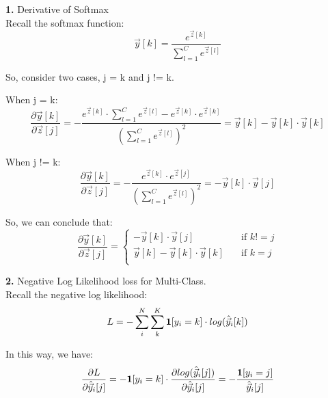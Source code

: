 \begin{description}
\item{\bf \large 1. } Derivative of Softmax \\
Recall the softmax function:
\begin{equation}
	\vec{y}[k] = \frac{e^{\vec{z}[k]}}{\sum_{l=1}^C e^{\vec{z}[l]}}
\end{equation}

So, consider two cases, j = k and j != k. 

When j = k:
\begin{equation}
	\frac{\partial \vec{y}[k]}{\partial \vec{z}[j]} 
		= - \frac{e^{\vec{z}[k]} \cdot \sum_{l=1}^C e^{\vec{z}[l]} - e^{\vec{z}[k]} \cdot e^{\vec{z}[k]}} 
				{(\sum_{l=1}^C e^{\vec{z}[l]})^2}
		= \vec{y}[k] - \vec{y}[k] \cdot \vec{y}[k]
\end{equation}

When j != k:
\begin{equation}
	\frac{\partial \vec{y}[k]}{\partial \vec{z}[j]} 
		= - \frac{e^{\vec{z}[k]} \cdot e^{\vec{z}[j]}} 
				{(\sum_{l=1}^C e^{\vec{z}[l]})^2}
		= - \vec{y}[k] \cdot \vec{y}[j]
\end{equation}

So, we can conclude that:
\begin{equation}
	\frac{\partial \vec{y}[k]}{\partial \vec{z}[j]} = 
	\begin{cases}
		- \vec{y}[k] \cdot \vec{y}[j]				& \quad \text{if } k != j \\
		\vec{y}[k] - \vec{y}[k] \cdot \vec{y}[k]	& \quad \text{if } k = j \\
	\end{cases}
\end{equation}


\item{\bf \large 2. } Negative Log Likelihood loss for Multi-Class. \\
Recall the negative log likelihood: 
\begin{equation}
	L = - \sum_i^N \sum_k^K {\bf 1}[y_i = k] \cdot log(\hat{\vec{y}}_i[k])
\end{equation}

In this way, we have:
\begin{equation}
	\frac{\partial L}{\partial \hat{\vec{y}}_i[j]} 
	= - {\bf 1}[y_i = k] \cdot \frac{\partial log(\hat{\vec{y}}_i[j])}{\partial \hat{\vec{y}}_i[j]}
	= - \frac{{\bf 1}[y_i = j]}{\hat{\vec{y}}_i[j]}
\end{equation}



\end{description}
